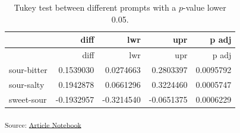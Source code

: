 \documentclass[
  letterpaper,
  DIV=11,
  numbers=noendperiod]{scrartcl}
\begin{document}
\begin{longtable}[]{@{}lrrrr@{}}
\caption{Tukey test between different prompts with a \(p\)-value lower
0.05.}\tabularnewline
\toprule\noalign{}
& diff & lwr & upr & p adj \\
\midrule\noalign{}
\endfirsthead
\toprule\noalign{}
& diff & lwr & upr & p adj \\
\midrule\noalign{}
\endhead
\bottomrule\noalign{}
\endlastfoot
sour-bitter & 0.1539030 & 0.0274663 & 0.2803397 & 0.0095792 \\
sour-salty & 0.1942878 & 0.0661296 & 0.3224460 & 0.0005747 \\
sweet-sour & -0.1932957 & -0.3214540 & -0.0651375 & 0.0006229 \\
\end{longtable}

\textsubscript{Source:
\href{https://matteospanio.github.io/multimodal-symphony-survey-analysis/index.qmd.html}{Article
Notebook}}
\end{document}
